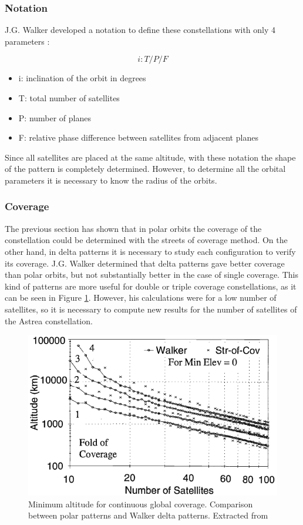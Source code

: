 \subsubsection{Notation}
\label{FullNotation}
J.G. Walker developed a notation to define these constellations with only 4 parameters \cite{Walker1977}:

\begin{equation*}
i: T/P/F
\end{equation*}
\begin{itemize}
\item i: inclination of the orbit in degrees
\item T: total number of satellites
\item P: number of planes
\item F: relative phase difference between satellites from adjacent planes
\end{itemize}

Since all satellites are placed at the same altitude, with these notation the shape of the pattern is completely determined. However, to determine all the orbital parameters it is necessary to know the radius of the orbits.

\subsubsection{Coverage}
\label{FullCoverage}
The previous section has shown that in polar orbits the coverage of the constellation could be determined with the streets of coverage method. On the other hand, in delta patterns it is necessary to study each configuration to verify its coverage. J.G. Walker determined that delta patterns gave better coverage than polar orbits, but not substantially better in the case of single coverage. This kind of patterns are more useful for double or triple coverage constellations, as it can be seen in Figure \ref{fig:Walker vs. polar}. However, his calculations were for a low number of satellites, so it is necessary to compute new results for the number of satellites of the Astrea constellation.

\begin{figure}[h]
\centerline{\includegraphics[scale=0.75]{foldofcoverage.png}}
\caption[Minimum altitude for continuous global coverage]{Minimum altitude for continuous global coverage. Comparison between polar patterns and Walker delta patterns. Extracted from \cite{Chobotov2002}}
\label{fig:Walker vs. polar}
\end{figure}